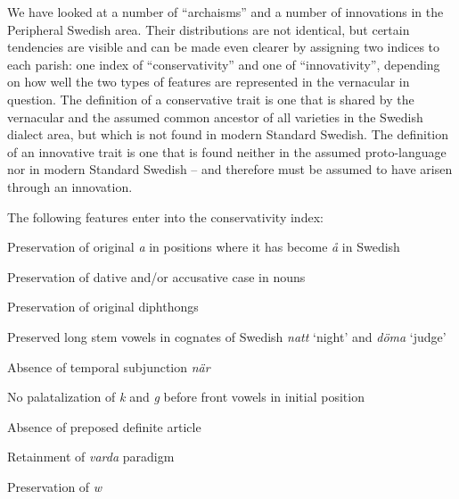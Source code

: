 \begin{styleBodyTextFirst}
We have looked at a number of “archaisms” and a number of innovations in the Peripheral Swedish area. Their distributions are not identical, but certain tendencies are visible and can be made even clearer by assigning two indices to each parish: one index of “conservativity” and one of “innovativity”, depending on how well the two types of features are represented in the vernacular in question. The definition of a conservative trait is one that is shared by the vernacular and the assumed common ancestor of all varieties in the Swedish dialect area, but which is not found in modern Standard Swedish. The definition of an innovative trait is one that is found neither in the assumed proto-language nor in modern Standard Swedish – and therefore must be assumed to have arisen through an innovation. 

\end{styleBodyTextFirst}

The following features enter into the conservativity index:

\begin{listWWNumxiiileveli}
\item {}

Preservation of original \textit{a} in positions where it has become \textit{å} in Swedish

\item {}

Preservation of dative and/or accusative case in nouns

\item {}

Preservation of original diphthongs

\item {}

Preserved long stem vowels in cognates of Swedish \textit{natt} ‘night’ and \textit{döma} ‘judge’

\item {}

Absence of temporal subjunction \textit{när}

\item {}

No palatalization of \textit{k} and \textit{g} before front vowels in initial position

\item {}

Absence of preposed definite article

\item {}

Retainment of \textit{varda} paradigm

\item {}

Preservation of \textit{w}

\end{listWWNumxiiileveli}

